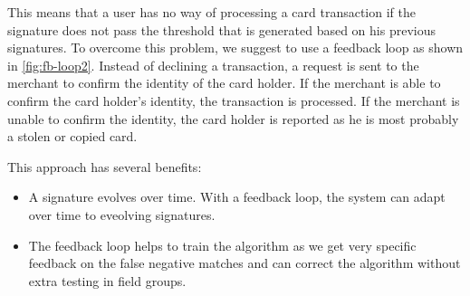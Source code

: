 \documentclass[a4paper, oneside]{csthesis}
\begin{document}
This means that a user has no way of processing a card transaction if the signature does not pass the threshold that is generated based on his previous signatures. To overcome this problem, we suggest to use a feedback loop as shown in \ref{fig:fb-loop2}. Instead of declining a transaction, a request is sent to the merchant to confirm the identity of the card holder. If the merchant is able to confirm the card holder's identity, the transaction is processed. If the merchant is unable to confirm the identity, the card holder is reported as he is most probably a stolen or copied card.

This approach has several benefits:
\begin{itemize}
\item A signature evolves over time. With a feedback loop, the system can adapt over time to eveolving signatures.
\item The feedback loop helps to train the algorithm as we get very specific feedback on the false negative matches and can correct the algorithm without extra testing in field groups.
\end{itemize}
\end{document}
